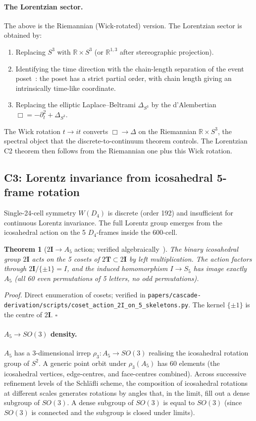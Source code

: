 \documentclass[11pt]{article}
\theoremstyle{plain}
\newtheorem{theorem}{Theorem}[section]
\theoremstyle{definition}
\theoremstyle{remark}
\newcommand{\twoI}{2\mathbf{I}}
\newcommand{\twoT}{2\mathbf{T}}
\begin{document}
\paragraph{The Lorentzian sector.}
The above is the Riemannian (Wick-rotated) version. The Lorentzian sector is obtained by:
\begin{enumerate}[leftmargin=2em]
\item Replacing $S^3$ with $\mathbb{R} \times S^3$ (or $\mathbb{R}^{1,3}$ after stereographic projection).
\item Identifying the time direction with the chain-length separation of the event poset~\citep{cascadeGR}: the poset has a strict partial order, with chain length giving an intrinsically time-like coordinate.
\item Replacing the elliptic Laplace--Beltrami $\Delta_{S^3}$ by the d'Alembertian $\Box = -\partial_t^2 + \Delta_{S^3}$.
\end{enumerate}
The Wick rotation $t \to it$ converts $\Box \to \Delta$ on the Riemannian $\mathbb{R} \times S^3$, the spectral object that the discrete-to-continuum theorem controls. The Lorentzian C2 theorem then follows from the Riemannian one plus this Wick rotation.

\subsection{C3: Lorentz invariance from icosahedral 5-frame rotation}\label{sec:gravity-C3}

Single-24-cell symmetry $W(D_4)$ is discrete (order 192) and insufficient for continuous Lorentz invariance. The full Lorentz group emerges from the icosahedral action on the 5 $D_4$-frames inside the 600-cell.

\begin{theorem}[$2\mathbf{I} \to A_5$ action; verified algebraically~\citep{cascadeGR}]\label{thm:2I-A5}
The binary icosahedral group $\twoI$ acts on the 5 cosets of $\twoT \subset \twoI$ by left multiplication. The action factors through $\twoI / \{\pm 1\} = I$, and the induced homomorphism $I \to S_5$ has image exactly $A_5$ (all 60 even permutations of 5 letters, no odd permutations).
\end{theorem}

\noindent\emph{Proof.} Direct enumeration of cosets; verified in \texttt{papers/cascade-derivation/scripts/coset\_action\_2I\_on\_5\_skeletons.py}. The kernel $\{\pm 1\}$ is the centre of $\twoI$. \hfill$\square$

\paragraph{$A_5 \to SO(3)$ density.}
$A_5$ has a 3-dimensional irrep $\rho_3: A_5 \to SO(3)$ realising the icosahedral rotation group of $S^2$. A generic point orbit under $\rho_3(A_5)$ has 60 elements (the icosahedral vertices, edge-centres, and face-centres combined). Across successive refinement levels of the Schl\"afli scheme, the composition of icosahedral rotations at different scales generates rotations by angles that, in the limit, fill out a dense subgroup of $SO(3)$. A dense subgroup of $SO(3)$ is equal to $SO(3)$ (since $SO(3)$ is connected and the subgroup is closed under limits).
\end{document}
